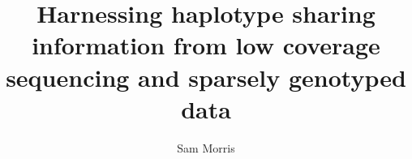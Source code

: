 
\title{Harnessing haplotype sharing information from low coverage sequencing and sparsely genotyped data}
\author{Sam Morris}

\maketitle
\makedeclaration


